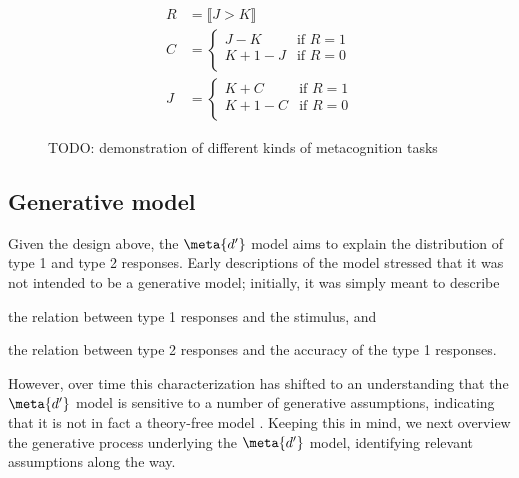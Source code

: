 \begin{align*}
    R &= \llbracket J > K \rrbracket \\
    C &= \begin{cases}
       J-K & \textrm{if } R=1 \\
       K+1-J & \textrm{if } R=0 \\
    \end{cases} \\
    J &= \begin{cases}
       K+C & \textrm{if } R=1 \\
       K+1-C & \textrm{if } R=0 \\
    \end{cases}
\end{align*}

\begin{figure}
    \centering
    \caption{TODO: demonstration of different kinds of metacognition tasks}
    \label{fig:measurement}
\end{figure}


\subsection{Generative model}
Given the design above, the $\meta{d'}$ model aims to explain the distribution of type 1 and type 2 responses. Early descriptions of the model stressed that it was not intended to be a generative model; initially, it was simply meant to describe \begin{seriate}
    \item the relation between type 1 responses and the stimulus, and
    \item the relation between type 2 responses and the accuracy of the type 1 responses.
\end{seriate}
However, over time this characterization has shifted to an understanding that the $\meta{d'}$ model is sensitive to a number of generative assumptions, indicating that it is not in fact a theory-free model \parencite{guggenmos2021, rausch2023}. Keeping this in mind, we next overview the generative process underlying the $\meta{d'}$ model, identifying relevant assumptions along the way.
 
